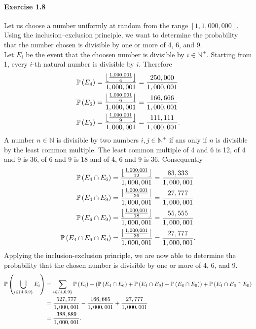 \paragraph{Exercise 1.8} Let us choose a number uniformly at random from the range
$[1, 1,000,000]$. Using the inclusion–exclusion principle, we want to determine
the probability that the number chosen is divisible by one or more of 4, 6, and 9. \\
Let $E_i$ be the event that the choosen number is divisible by $i\in \mathbb{N}^+$.
Starting from 1, every $i$-th natural number is divisible by $i$. Therefore
\begin{align*}
  \mathbb{P}\left(E_4\right) &= \frac{\left\lfloor \frac{1,000,001}{4} \right\rfloor}{1,000,001} = \frac{250,000}{1,000,001} \\
  \mathbb{P}\left(E_6\right) &= \frac{\left\lfloor \frac{1,000,001}{6} \right\rfloor}{1,000,001} = \frac{166,666}{1,000,001} \\
  \mathbb{P}\left(E_9\right) &= \frac{\left\lfloor \frac{1,000,001}{9} \right\rfloor}{1,000,001} = \frac{111,111}{1,000,001}.
\end{align*}
A number $n \in \mathbb{N}$ is divisible by two numbers $i,j \in \mathbb{N}^+$
if ans only if $n$ is divisible by the least common multiple. The least
common multiple of 4 and 6 is 12, of 4 and 9 is 36, of 6 and 9 is 18 and of 4, 6
and 9 is 36. Consequently
\begin{align*}
  \mathbb{P}\left(E_4 \cap E_6\right) &= \frac{\left\lfloor \frac{1,000,001}{12} \right\rfloor}{1,000,001} = \frac{83,333}{1,000,001} \\
  \mathbb{P}\left(E_4 \cap E_9\right) &= \frac{\left\lfloor \frac{1,000,001}{36} \right\rfloor}{1,000,001} = \frac{27,777}{1,000,001} \\
  \mathbb{P}\left(E_6 \cap E_9\right) &= \frac{\left\lfloor \frac{1,000,001}{18} \right\rfloor}{1,000,001} = \frac{55,555}{1,000,001} \\
  \mathbb{P}\left(E_4 \cap E_6 \cap E_9\right) &= \frac{\left\lfloor \frac{1,000,001}{36} \right\rfloor}{1,000,001} = \frac{27,777}{1,000,001}.
\end{align*}
Applying the inclusion-exclusion principle, we are now able to determine the
probability that the chosen number is divisible by one or more of 4, 6, and 9.
\begin{align*}
  \mathbb{P}\left(\bigcup_{i\in \{4,6,9\}}E_i\right)
    &= \sum_{i\in \{4,6,9\}} \mathbb{P}\left(E_i\right) -
       \left(\mathbb{P}\left(E_4 \cap E_6\right) + \mathbb{P}\left(E_4 \cap E_9\right) + \mathbb{P}\left(E_6 \cap E_9\right)\right) + \mathbb{P}\left(E_4 \cap E_6 \cap E_9 \right) \\
    &= \frac{527,777}{1,000,001} - \frac{166,665}{1,000,001} + \frac{27,777}{1,000,001} \\
    &= \frac{388,889}{1,000,001}.
\end{align*}
